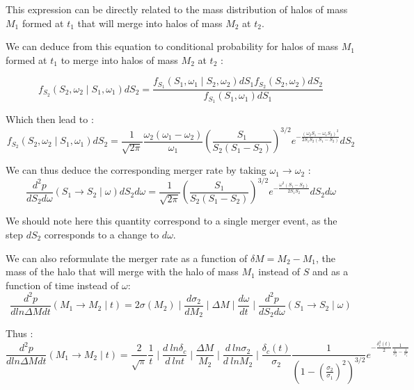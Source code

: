 This expression can be directly related to the mass distribution of halos of mass $M_1$ formed at $t_1$ that will merge into halos of mass $M_2$ at $t_2$.

We can deduce from this equation to conditional probability for halos of mass $M_1$ formed at $t_1$ to merge into halos of mass $M_2$ at $t_2$ :

\begin{equation}
\label{Cond Proba 2}
f_{S_2}(S_2, \omega_2 \mid S_1, \omega_1) dS_2 = \frac{f_{S_1}(S_1, \omega_1 \mid S_2, \omega_2) dS_1 f_{S_2}(S_2, \omega_2) dS_2}{f_{S_1}(S_1, \omega_1) dS_1}
\end{equation}

Which then lead to :
\begin{equation}
\label{Cond Proba 3}
f_{S_2}(S_2, \omega_2 \mid S_1, \omega_1) dS_2 = \frac{1}{\sqrt{2\pi}} \frac{\omega_2(\omega_1 - \omega_2)}{\omega_1} \left(\frac{S_1}{S_2(S_1 - S_2)}\right)^{3/2} e^{-\frac{(\omega_2 S_1 - \omega_1 S_2)^2}{2S_1 S_2 (S_1 - S_2)} } dS_2
\end{equation}

We can thus deduce the corresponding merger rate by taking $\omega_1 \rightarrow \omega_2$ :
\begin{equation}
\label{MERGER RATE}
\frac{d^2p}{dS_2 d\omega} (S_1 \rightarrow S_2 \mid \omega) dS_2 d\omega = \frac{1}{\sqrt{2\pi}} \left(\frac{S_1}{S_2(S_1 - S_2)}\right)^{3/2} e^{-\frac{\omega^2 (S_1 - S_2)}{2S_1 S_2} } dS_2 d\omega
\end{equation}

We should note here this quantity correspond to a single merger event, as the step $dS_2$ corresponds to a change to $d\omega$.

We can also reformulate the merger rate as a function of $\delta M = M_2 - M_1$, the mass of the halo that will merge with the halo of mass $M_1$ instead of $S$ and as a function of time instead of $\omega$:
\begin{equation}
\label{MERGER RATE CALC}
\frac{d^2p}{d ln \Delta M dt} (M_1 \rightarrow M_2 \mid t) = 2\sigma(M_2) \mid \frac{d\sigma_2}{d M_2} \mid \Delta M \mid \frac{d\omega}{dt} \mid \frac{d^2p}{dS_2 d\omega} (S_1 \rightarrow S_2 \mid \omega) 
\end{equation}

Thus :
\begin{equation}
\label{MERGER RATE CALC 2}
\frac{d^2p}{d ln \Delta M dt} (M_1 \rightarrow M_2 \mid t)=  \frac{2}{\sqrt{\pi}} \frac{1}{t} \mid \frac{d \ ln \delta_c}{d \ ln t}\mid \frac{\Delta M}{M_2} \mid \frac{d \ ln \sigma_2}{d \ ln M_2} \mid \frac{\delta_c (t)}{\sigma_2} \frac{1}{\left(1 - (\frac{\sigma_2}{\sigma_1})^2 \right)^{3/2}} e^{-\frac{\delta_c^2 (t)}{2} \frac{1}{\frac{1}{\sigma_2^2} - \frac{1}{\sigma^2_1}} }
\end{equation}

